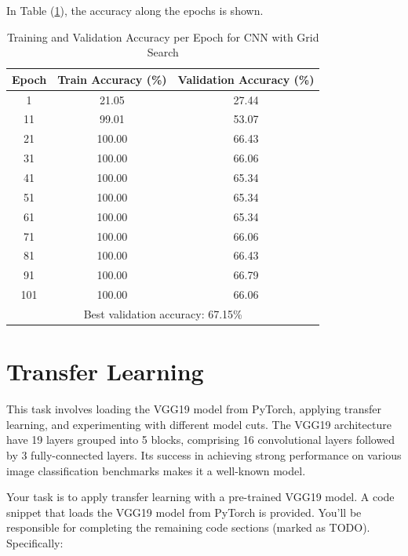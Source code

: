 \documentclass[11pt]{scrartcl}
\begin{document}
In Table (\ref{tab:task2-bonus-accuracy}), the accuracy along the epochs is shown.

\begin{table}[htbp]
\centering
\caption{Training and Validation Accuracy per Epoch for CNN with Grid Search}
\begin{tabular}{ccc}
\toprule
\textbf{Epoch} & \textbf{Train Accuracy (\%)} & \textbf{Validation Accuracy (\%)} \\
\midrule
1    & 21.05 & 27.44 \\
11   & 99.01 & 53.07 \\
21   & 100.00 & 66.43 \\
31   & 100.00 & 66.06 \\
41   & 100.00 & 65.34 \\
51   & 100.00 & 65.34 \\
61   & 100.00 & 65.34 \\
71   & 100.00 & 66.06 \\
81   & 100.00 & 66.43 \\
91   & 100.00 & 66.79 \\
101  & 100.00 & 66.06 \\
\midrule
\multicolumn{3}{c}{Best validation accuracy: 67.15\%} \\
\bottomrule
\end{tabular}
\label{tab:task2-bonus-accuracy}
\end{table}


\newpage
\section{Transfer Learning}

This task involves loading the VGG19 model from PyTorch, 
applying transfer learning, and experimenting with different model cuts. 
The VGG19 architecture have 19 layers grouped into 5 blocks, 
comprising 16 convolutional layers followed by 3 fully-connected layers. 
Its success in achieving strong performance on various image classification benchmarks 
makes it a well-known model.

Your task is to apply transfer learning with a pre-trained VGG19 model. 
A code snippet that loads the VGG19 model from PyTorch is provided. 
You'll be responsible for completing the remaining code sections (marked as TODO). 
Specifically:
\end{document}
